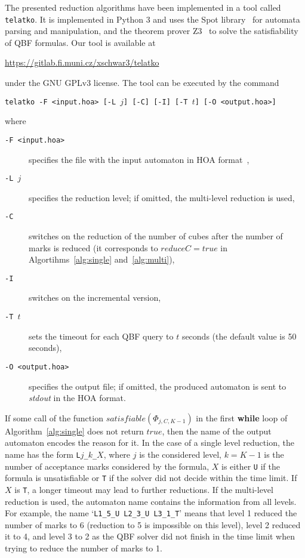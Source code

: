 \documentclass[a4paper,UKenglish,cleveref,autoref,thm-restate]{lipics-v2021}
\newcommand{\todo}[1]{\marginpar{\textcolor{red}{#1}}}
\def\true{\mathit{true}}
\newcommand{\telatko}{\texttt{telatko}\xspace}
\begin{document}
The presented reduction algorithms have been implemented in a tool
called \telatko. It is implemented in Python 3 and uses the Spot
library~\cite{duret.16.atva2} for automata parsing and manipulation,
and the theorem prover Z3~\cite{demoura.08.tacas} to solve the
satisfiability of QBF formulas. Our tool is available at
\begin{center}
\url{https://gitlab.fi.muni.cz/xschwar3/telatko}
\end{center}
under the GNU GPLv3
license. The tool can be executed by the command 
\begin{center}
  \texttt{telatko -F <input.hoa> [-L }$j$\texttt{] [-C] [-I] [-T }$t$\texttt{] [-O <output.hoa>]}
\end{center}
where
\begin{description}
\item[\texttt{-F <input.hoa>}] specifies the file with the input automaton in HOA format~\cite{babiak.15.cav}, 
\item[\texttt{-L }$j$] specifies the reduction level; if omitted, the multi-level reduction is used,
\item[\texttt{-C}] switches on the reduction of the number of cubes
  after the number of marks is reduced (it corresponds to
  $\mathit{reduceC}=\true$ in Algortihms~\ref{alg:single}
  and~\ref{alg:multi}),
\item[\texttt{-I}] switches on the incremental version,
\item[\texttt{-T }$t$] sets the timeout for each QBF query to $t$ seconds (the default value is 50 seconds), 
\item[\texttt{-O <output.hoa>}] specifies the output file; if omitted,
  the produced automaton is sent to \textit{stdout} in the HOA format.
\end{description}

\todo{Nekde zminit, ze inkrementalni pristup je implementovan jen pro prvni while loop? Je to tak, Terko?}

If some call of the function
$\mathit{satisfiable}(\Phi_{j,C,K{-}1})$ in the first
\textbf{while} loop of Algorithm~\ref{alg:single} does not return
$\true$, then the name of the output automaton encodes the reason for
it. In the case of a single level reduction, the name has the form
\texttt{L$j$\_$k$\_$X$}, where $j$ is the considered level, $k=K-1$ is
the number of acceptance marks considered by the formula, $X$ is either
\texttt{U} if the formula is unsatisfiable or \texttt{T} if the solver
did not decide within the time limit. If $X$ is \texttt{T}, a longer
timeout may lead to further reductions. If the multi-level reduction
is used, the automaton name contains the information from all
levels. For example, the name `\texttt{L1\_5\_U L2\_3\_U L3\_1\_T}'
means that level 1 reduced the number of marks to 6 (reduction to 5 is
impossible on this level), level 2 reduced it to 4, and level 3 to 2
as the QBF solver did not finish in the time limit when trying to
reduce the number of marks to
1.%
\end{document}
